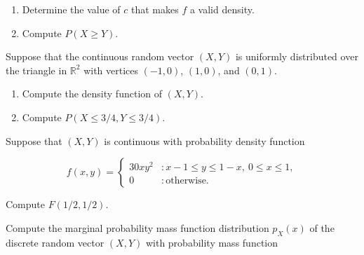 \documentclass[12pt,reqno]{amsart}
\begin{document}
\medskip
\begin{enumerate}
    \item Determine the value of $c$ that makes $f$ a valid density.\vfill
    
    

    \item Compute $P(X\geq Y)$.\vfill
    

\end{enumerate}








\bigskip
\prob Suppose that the continuous random vector $(X,Y)$ is uniformly distributed over the triangle in $\mathbb{R}^2$ with vertices $(-1,0)$, $(1,0)$, and $(0,1)$.

\medskip
\begin{enumerate}
    \item Compute the density function of $(X,Y)$.\vfill
    
    

    \item Compute $P(X \leq 3/4, Y \leq 3/4)$.\vfill
    
    
\end{enumerate}

















\bigskip
\prob Suppose that $(X,Y)$ is continuous with probability density function

    \[f(x,y) = \begin{cases}
        30xy^2 & : x-1 \leq y \leq 1-x, \ 0 \leq x \leq 1, \\
        0 & : \text{otherwise}.
    \end{cases}\]

Compute $F(1/2,1/2)$.\vfill















\newpage
\prob Compute the marginal probability mass function distribution $p_X(x)$ of the discrete random vector $(X,Y)$ with probability mass function
\end{document}
